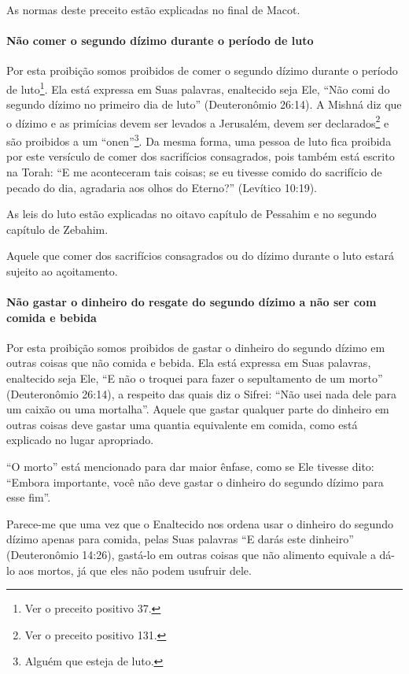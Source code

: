 As normas deste preceito estão explicadas no final de Macot.

\paragraph{Não comer o segundo dízimo durante o período de luto}

Por esta proibição somos proibidos de comer o segundo dízimo durante o
período de luto\footnote{Ver o preceito positivo 37.}. Ela está expressa em Suas
palavras, enaltecido seja Ele, ``Não comi do segundo dízimo no primeiro
dia de luto'' (Deuteronômio 26:14). A Mishná diz que o dízimo e as
primícias devem ser levados a Jerusalém, devem ser
declarados\footnote{Ver o preceito positivo 131.} e são proibidos a um
``onen''\footnote{Alguém que esteja de luto.}. Da mesma forma, uma pessoa de luto fica
proibida por este versículo de comer dos sacrifícios consagrados, pois
também está escrito na Torah: ``E me aconteceram tais coisas; se eu
tivesse comido do sacrifício de pecado do dia, agradaria aos olhos do
Eterno?'' (Levítico 10:19).

As leis do luto estão explicadas no oitavo capítulo de Pessahim e no
segundo capítulo de Zebahim.

Aquele que comer dos sacrifícios consagrados ou do dízimo durante o
luto estará sujeito ao açoitamento.

\paragraph{Não gastar o dinheiro do resgate do segundo dízimo a não ser com
comida e bebida}

Por esta proibição somos proibidos de gastar o dinheiro do segundo
dízimo em outras coisas que não comida e bebida. Ela está expressa em
Suas palavras, enaltecido seja Ele, ``E não o troquei para fazer o
sepultamento de um morto'' (Deuteronômio 26:14), a respeito das quais
diz o Sifrei: ``Não usei nada dele para um caixão ou uma mortalha''.
Aquele que gastar qualquer parte do dinheiro em outras coisas deve
gastar uma quantia equivalente em comida, como está explicado no lugar
apropriado.

``O morto'' está mencionado para dar maior ênfase, como se Ele tivesse
dito: ``Embora importante, você não deve gastar o dinheiro do segundo
dízimo para esse fim''.

Parece-me que uma vez que o Enaltecido nos ordena usar o dinheiro do
segundo dízimo apenas para comida, pelas Suas palavras ``E darás este
dinheiro'' (Deuteronômio 14:26), gastá-lo em outras coisas que não
alimento equivale a dá-lo aos mortos, já que eles não podem usufruir
dele.

